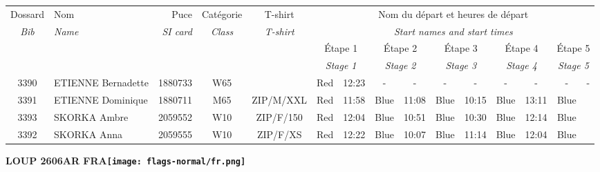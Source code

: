 \documentclass{report}
\begin{document}
  \begin{longtable}{|c|l|r|c|c|*{5}{cc|}}
    Dossard & Nom  & Puce    & Catégorie & T-shirt & \multicolumn{10}{c|}{Nom du départ et heures de départ} \\
    \itshape Bib     & \itshape Name & \itshape SI card & \itshape Class  & \itshape  T-shirt  & \multicolumn{10}{c|}{\itshape Start names and start times} \\
    \hline
    & & & & & \multicolumn{2}{c|}{Étape 1} & \multicolumn{2}{c|}{Étape 2} & \multicolumn{2}{c|}{Étape 3} & \multicolumn{2}{c|}{Étape 4} & \multicolumn{2}{c|}{Étape 5} \\
    & & & & & \multicolumn{2}{c|}{\itshape Stage 1} & \multicolumn{2}{c|}{\itshape Stage 2} & \multicolumn{2}{c|}{\itshape Stage 3} & \multicolumn{2}{c|}{\itshape Stage 4} & \multicolumn{2}{c|}{\itshape Stage 5} \\
    \hline
    3390 & ETIENNE Bernadette & 1880733 & W65 &   & Red & 12:23 & - &  - & - &  - & - &  - & - &  -\\
    3391 & ETIENNE Dominique & 1880711 & M65 & ZIP/M/XXL & Red & 11:58 & Blue & 11:08 & Blue & 10:15 & Blue & 13:11 & Blue &  \\
    3393 & SKORKA Ambre & 2059552 & W10 & ZIP/F/150 & Red & 12:04 & Blue & 10:51 & Blue & 10:30 & Blue & 12:14 & Blue &  \\
    3392 & SKORKA Anna & 2059555 & W10 & ZIP/F/XS & Red & 12:22 & Blue & 10:07 & Blue & 11:14 & Blue & 12:04 & Blue &  \\
  \end{longtable}
\newpage
  \Huge \centering \bfseries LOUP 2606AR FRA\normalfont \footnotesize \sffamily \hfill \texttt{[image: flags-normal/fr.png]} \newline 
\end{document}
